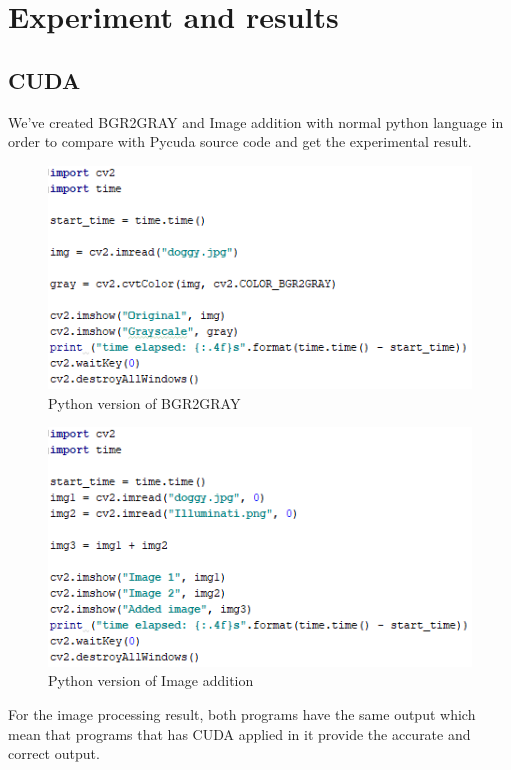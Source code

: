 \documentclass[11pt]{article}
\begin{document}
\newpage
\section{Experiment and results}\label{sec:exp}
\subsection*{CUDA}
We’ve created BGR2GRAY and Image addition with normal python language in order to compare with Pycuda source code and get the experimental result.

\begin{figure}[h]
\centering
\includegraphics[scale=1]{bgr}
\caption{Python version of BGR2GRAY}
\end{figure}

\begin{figure}[h]
\centering
\includegraphics[scale=1]{add}
\caption{Python version of Image addition}
\end{figure}


\newpage
For the image processing result, both programs have the same output which mean that programs that has CUDA applied in it provide the accurate and correct output.
\end{document}
